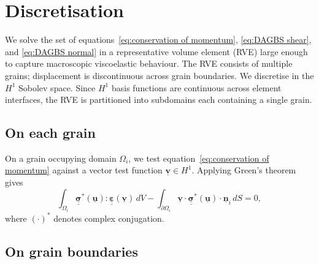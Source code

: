 \documentclass[12pt]{article}
\newcommand{\tensor}[1]{\underline{\underline{\boldsymbol{#1}}}}
\newcommand{\vect}[1]{\underline{\boldsymbol{#1}}}
\begin{document}
\section{Discretisation}

We solve the set of equations~\eqref{eq:conservation of momentum}, \eqref{eq:DAGBS shear}, and \eqref{eq:DAGBS normal} in a representative volume element (RVE) large enough to capture macroscopic viscoelastic behaviour. The RVE consists of multiple grains; displacement is discontinuous across grain boundaries. We discretise in the $H^1$ Sobolev space. Since $H^1$ basis functions are continuous across element interfaces, the RVE is partitioned into subdomains each containing a single grain.

\subsection{On each grain}

On a grain occupying domain $\Omega_i$, we test equation~\eqref{eq:conservation of momentum} against a vector test function $\vect{v} \in H^1$. Applying Green's theorem gives
\begin{equation}
    \int_{\Omega_i} \tensor{\sigma}^*(\vect{u}) : \tensor{\varepsilon}(\vect{v})\, dV
    - \int_{\partial\Omega_i} \vect{v}\cdot\tensor{\sigma}^*(\vect{u})\cdot\vect{n}_i\, dS = 0, \label{eq:ingrain weak}
\end{equation}
where $(\cdot)^*$ denotes complex conjugation.

\subsection{On grain boundaries}
\label{sec:gb}
\end{document}
